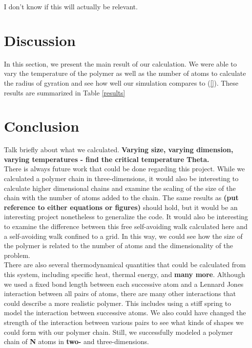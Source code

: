 \documentclass{article}
\begin{document}
\begin{multicols}{2}
I don't know if this will actually be relevant.  

\section{Discussion}
\label{discuss}

In this section, we present the main result of our calculation.  We were able to vary the temperature of the polymer as well as the number of atoms to calculate the radius of gyration and see how well our simulation compares to (\ref{}).  These results are summarized in Table \ref{results}

\section{Conclusion}
\label{concl}

Talk briefly about what we calculated.  \textbf{Varying size, varying dimension, varying temperatures - find the critical temperature Theta.}\\

There is always future work that could be done regarding this project.  While we calculated a polymer chain in three-dimensions, it would also be interesting to calculate higher dimensional chains and examine the scaling of the size of the chain with the number of atoms added to the chain.  The same results as \textbf{(put reference to either equations or figures)} should hold, but it would be an interesting project nonetheless to generalize the code.  It would also be interesting to examine the difference between this free self-avoiding walk calculated here and a self-avoiding walk confined to a grid.  In this way, we could see how the size of the polymer is related to the number of atoms and the dimensionality of the problem.  \\

There are also several thermodynamical quantities that could be calculated from this system, including specific heat, thermal energy, and \textbf{many more}.  Although we used a fixed bond length between each successive atom and a Lennard Jones interaction between all pairs of atoms, there are many other interactions that could describe a more realistic polymer.  This includes using a stiff spring to model the interaction between successive atoms.  We also could have changed the strength of the interaction between various pairs to see what kinds of shapes we could form with our polymer chain.  Still, we successfully modeled a polymer chain of \textbf{N} atoms in \textbf{two-} and three-dimensions.  

\end{multicols}


\end{document}
